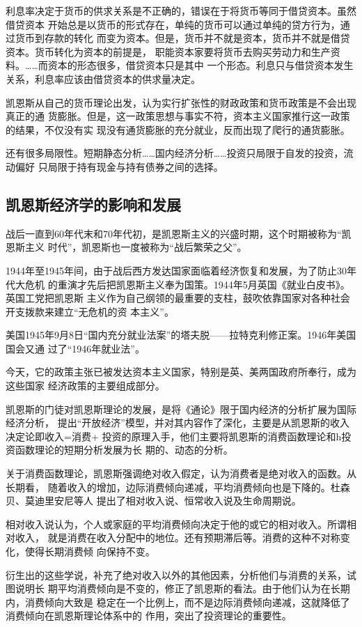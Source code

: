 利息率决定于货币的供求关系是不正确的，错误在于将货币等同于借贷资本。虽然借贷资本
开始总是以货币的形式存在，单纯的货币可以通过单纯的贷方行为，通过货币到存款的转化
而变为资本。但是，货币并不就是资本，货币并不就是借贷资本。货币转化为资本的前提是，
职能资本家要将货币去购买劳动力和生产资料。……而资本的形态很多，借贷资本只是其中
一个形态。利息只与借贷资本发生关系，利息率应该由借贷资本的供求量决定。

凯恩斯从自己的货币理论出发，认为实行扩张性的财政政策和货币政策是不会出现真正的通
货膨胀。但是，这一政策思想与事实不符，资本主义国家推行这一政策的结果，不仅没有实
现没有通货膨胀的充分就业，反而出现了爬行的通货膨胀。

还有很多局限性。短期静态分析……国内经济分析……投资只局限于自发的投资，流动偏好
只局限于持有现金与持有债券之间的选择。

\subsection{凯恩斯经济学的影响和发展}

战后一直到60年代末和70年代初，是凯恩斯主义的兴盛时期，这个时期被称为“凯恩斯主义
时代”，凯恩斯也一度被称为“战后繁荣之父”。

1944年至1945年间，由于战后西方发达国家面临着经济恢复和发展，为了防止30年代大危机
的重演才先后把凯恩斯主义奉为国策。1944年5月英国《就业白皮书》。英国工党把凯恩斯
主义作为自己纲领的最重要的支柱，鼓吹依靠国家对各种社会开支拨款来建立“无危机的资
本主义”。

美国1945年9月8日“国内充分就业法案”的塔夫脱——拉特克利修正案。1946年美国国会又通
过了“1946年就业法”。

今天，它的政策主张已被发达资本主义国家，特别是英、美两国政府所奉行，成为这些国家
经济政策的主要组成部分。

凯恩斯的门徒对凯恩斯理论的发展，是将《通论》限于国内经济的分析扩展为国际经济分析，
提出“开放经济”模型，并对其内容作了深化，主要是从凯恩斯的收入决定论即收入=消费+
投资的原理入手，他们主要将凯恩斯的消费函数理论和h投资函数理论的短期分析发展为长
期的、动态的分析。

关于消费函数理论，凯恩斯强调绝对收入假定，认为消费者是绝对收入的函数。从长期看，
随着收入的增加，边际消费倾向递减，平均消费倾向也是下降的。杜森贝、莫迪里安尼等人
提出了相对收入说、恒常收入说及生命周期说。

相对收入说认为，个人或家庭的平均消费倾向决定于他的或它的相对收入。所谓相对收入，
就是消费在收入分配中的地位。还有预期滞后等。消费的这种不对称变化，使得长期消费倾
向保持不变。

衍生出的这些学说，补充了绝对收入以外的其他因素，分析他们与消费的关系，试图说明长
期平均消费倾向是不变的，修正了凯恩斯的看法。由于他们认为在长期内，消费倾向大致是
稳定在一个比例上，而不是边际消费倾向递减，这就降低了消费倾向在凯恩斯理论体系中的
作用，突出了投资理论的重要性。

